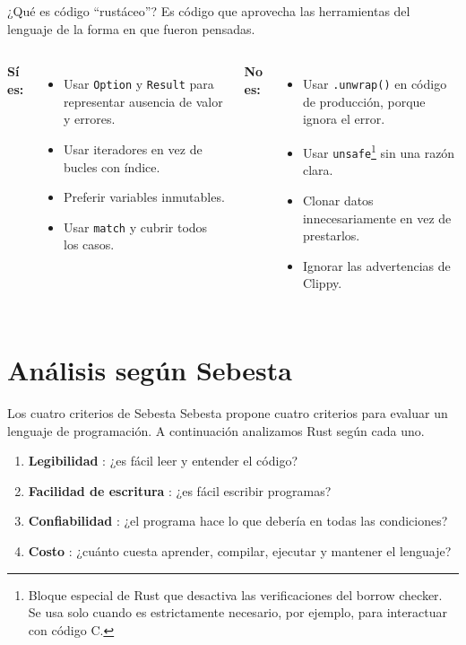 \documentclass[11pt, aspectratio=169]{beamer}
\begin{document}
	\begin{frame}{¿Qué es código ``rustáceo''?}
	Es código que aprovecha las herramientas del lenguaje de la forma en que fueron pensadas.
		\vspace{0.2cm}
		\begin{columns}
			\textbf{Sí es:}
			\begin{itemize}
				\item Usar \texttt{Option} y \texttt{Result} para representar ausencia de valor y errores.
				\item Usar iteradores en vez de bucles con índice.
				\item Preferir variables inmutables.
				\item Usar \texttt{match} y cubrir todos los casos.
			\end{itemize}
			
			\textbf{No es:}
			\begin{itemize}
				\item Usar \texttt{.unwrap()} en código de producción, porque ignora el error.
				\item Usar \texttt{unsafe}\footnote{Bloque especial de Rust que desactiva las verificaciones del borrow checker. Se usa solo cuando es estrictamente necesario, por ejemplo, para interactuar con código C.} sin una razón clara.
				\item Clonar datos innecesariamente en vez de prestarlos.
				\item Ignorar las advertencias de Clippy.
			\end{itemize}
		\end{columns}
	\end{frame}

	\section{Análisis según Sebesta}

	\begin{frame}{Los cuatro criterios de Sebesta}
		Sebesta propone cuatro criterios para evaluar un lenguaje de programación. A continuación analizamos Rust según cada uno.
		\vspace{0.3cm}
		\begin{enumerate}
			\item \textbf{Legibilidad} : ¿es fácil leer y entender el código?
			\item \textbf{Facilidad de escritura} : ¿es fácil escribir programas?
			\item \textbf{Confiabilidad} : ¿el programa hace lo que debería en todas las condiciones?
			\item \textbf{Costo} : ¿cuánto cuesta aprender, compilar, ejecutar y mantener el lenguaje?
		\end{enumerate}
	\end{frame}
\end{document}
